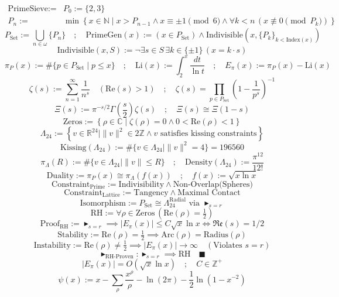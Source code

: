 \documentclass{article}
\newcommand{\AXIOM}{\blacktriangleright}
\newcommand{\DEF}{:=}
\newcommand{\AND}{\land}
\newcommand{\EQUIV}{\cong}
\newcommand{\COLON}{:}
\newcommand{\QED}{\blacksquare}
\newcommand{\NAT}{\mathbb{N}}
\newcommand{\INT}{\mathbb{Z}}
\newcommand{\REAL}{\mathbb{R}}
\newcommand{\COMPLEX}{\mathbb{C}}
\newcommand{\PICONST}{\pi}
\newcommand{\ZETA}{\zeta}
\newcommand{\CRITLINE}{\mathfrak{Re}(s)=1/2}
\newcommand{\LEECH}{\Lambda_{24}}
\begin{document}
\begin{align*}
\text{PrimeSieve} \DEF & P_0 \DEF \{2, 3\} \\
P_n \DEF & \min\left\{ x \in \NAT \mid x > P_{n-1} \AND x \equiv \pm 1 \pmod{6} \AND \forall k < n \, (x \not\equiv 0 \pmod{P_k}) \right\}
\end{align*}
\[
P_{\text{Set}} \DEF \bigcup_{n \in \omega} \{P_n\} \quad ; \quad \text{PrimeGen}(x) \DEF (x \in P_{\text{Set}}) \land \text{Indivisible}(x, \{P_k\}_{k<\text{Index}(x)})
\]
\[
\text{Indivisible}(x, S) \DEF \neg \exists s \in S \, \exists k \in \{\pm 1\} \, (x = k \cdot s)
\]
\[
\pi_P(x) \DEF \#\{p \in P_{\text{Set}} \mid p \leq x\} \quad ; \quad \text{Li}(x) \DEF \int_2^x \frac{dt}{\ln t} \quad ; \quad E_{\pi}(x) \DEF \pi_P(x) - \text{Li}(x)
\]
\[
\ZETA(s) \DEF \sum_{n=1}^\infty \frac{1}{n^s} \quad (\text{Re}(s) > 1) \quad ; \quad \ZETA(s) = \prod_{p \in P_{\text{Set}}} \left(1 - \frac{1}{p^s}\right)^{-1}
\]
\[
\Xi(s) \DEF \pi^{-s/2} \Gamma\left(\frac{s}{2}\right) \ZETA(s) \quad ; \quad \Xi(s) \EQUIV \Xi(1-s)
\]
\[
\text{Zeros} \DEF \left\{ \rho \in \COMPLEX \mid \ZETA(\rho) = 0 \land 0 < \text{Re}(\rho) < 1 \right\}
\]
\[
\LEECH \DEF \left\{ v \in \REAL^{24} \mid \|v\|^2 \in 2\INT \land v \text{ satisfies kissing constraints} \right\}
\]
\[
\text{Kissing}(\LEECH) \DEF \#\{v \in \LEECH \mid \|v\|^2 = 4\} = 196560
\]
\[
\pi_\Lambda(R) \DEF \#\{v \in \LEECH \mid \|v\| \leq R\} \quad ; \quad \text{Density}(\LEECH) \DEF \frac{\PICONST^{12}}{12!}
\]
\[
\text{Duality} \DEF \pi_P(x) \EQUIV \pi_\Lambda(f(x)) \quad ; \quad f(x) \DEF \sqrt{x \ln x}
\]
\[
\text{Constraint}_{\text{Prime}} \DEF \text{Indivisibility} \land \text{Non-Overlap(Spheres)}
\]
\[
\text{Constraint}_{\text{Lattice}} \DEF \text{Tangency} \land \text{Maximal Contact}
\]
\[
\text{Isomorphism} \DEF P_{\text{Set}} \cong \Lambda_{24}^{\text{Radial}} \text{ via } \AXIOM_{s=r}
\]
\[
\text{RH} \DEF \forall \rho \in \text{Zeros} \, (\text{Re}(\rho) = \tfrac{1}{2})
\]
\[
\text{Proof}_{\text{RH}} \DEF \AXIOM_{s=r} \implies |E_{\pi}(x)| \leq C\sqrt{x}\ln x \iff \CRITLINE
\]
\[
\text{Stability} \DEF \text{Re}(\rho) = \tfrac{1}{2} \implies \text{Arc}(\rho) = \text{Radius}(\rho)
\]
\[
\text{Instability} \DEF \text{Re}(\rho) \neq \tfrac{1}{2} \implies |E_{\pi}(x)| \to \infty \quad (\text{Violates } s=r)
\]
\[
\AXIOM_{\text{RH-Proven}} \COLON \AXIOM_{s=r} \implies \text{RH} \quad \QED
\]
\[
|E_{\pi}(x)| = O(\sqrt{x}\ln x) \quad ; \quad C \in \INT^+
\]
\[
\psi(x) \DEF x - \sum_{\rho} \frac{x^\rho}{\rho} - \ln(2\PICONST) - \frac{1}{2}\ln(1-x^{-2})
\]
\end{document}
